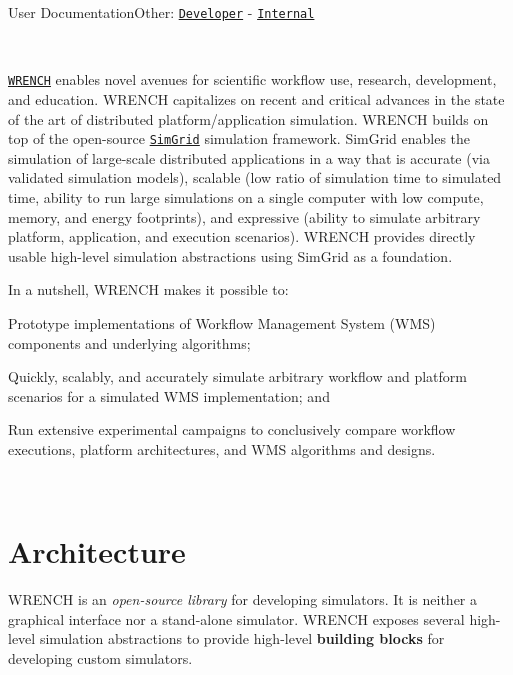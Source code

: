 User DocumentationOther\+: \href{../developer/}{\tt Developer} -\/ \href{../internal/}{\tt Internal}

 ~\newline
~\newline


\href{http://wrench-project.org}{\tt W\+R\+E\+N\+CH} enables novel avenues for scientific workflow use, research, development, and education. W\+R\+E\+N\+CH capitalizes on recent and critical advances in the state of the art of distributed platform/application simulation. W\+R\+E\+N\+CH builds on top of the open-\/source \href{http://simgrid.gforge.inria.fr}{\tt Sim\+Grid} simulation framework. Sim\+Grid enables the simulation of large-\/scale distributed applications in a way that is accurate (via validated simulation models), scalable (low ratio of simulation time to simulated time, ability to run large simulations on a single computer with low compute, memory, and energy footprints), and expressive (ability to simulate arbitrary platform, application, and execution scenarios). W\+R\+E\+N\+CH provides directly usable high-\/level simulation abstractions using Sim\+Grid as a foundation.

In a nutshell, W\+R\+E\+N\+CH makes it possible to\+:


\begin{DoxyItemize}
\item Prototype implementations of Workflow Management System (W\+MS) components and underlying algorithms;
\item Quickly, scalably, and accurately simulate arbitrary workflow and platform scenarios for a simulated W\+MS implementation; and
\item Run extensive experimental campaigns to conclusively compare workflow executions, platform architectures, and W\+MS algorithms and designs.
\end{DoxyItemize}

~\newline
\hypertarget{index_overview-architecture}{}\section{Architecture}\label{index_overview-architecture}
W\+R\+E\+N\+CH is an {\itshape open-\/source library} for developing simulators. It is neither a graphical interface nor a stand-\/alone simulator. W\+R\+E\+N\+CH exposes several high-\/level simulation abstractions to provide high-\/level {\bfseries building blocks} for developing custom simulators.

